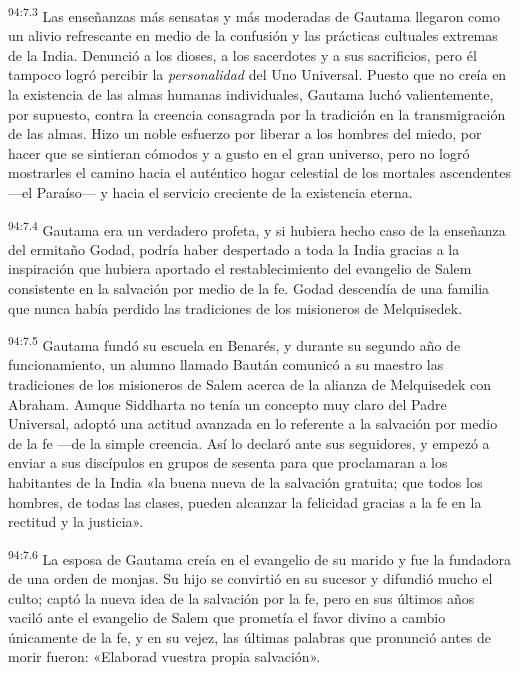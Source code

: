 \par
\textsuperscript{94:7.3} Las enseñanzas más sensatas y más moderadas de Gautama llegaron como un alivio refrescante en medio de la confusión y las prácticas cultuales extremas de la India. Denunció a los dioses, a los sacerdotes y a sus sacrificios, pero él tampoco logró percibir la \textit{personalidad} del Uno Universal. Puesto que no creía en la existencia de las almas humanas individuales, Gautama luchó valientemente, por supuesto, contra la creencia consagrada por la tradición en la transmigración de las almas. Hizo un noble esfuerzo por liberar a los hombres del miedo, por hacer que se sintieran cómodos y a gusto en el gran universo, pero no logró mostrarles el camino hacia el auténtico hogar celestial de los mortales ascendentes ---el Paraíso--- y hacia el servicio creciente de la existencia eterna.

\par
\textsuperscript{94:7.4} Gautama era un verdadero profeta, y si hubiera hecho caso de la enseñanza del ermitaño Godad, podría haber despertado a toda la India gracias a la inspiración que hubiera aportado el restablecimiento del evangelio de Salem consistente en la salvación por medio de la fe. Godad descendía de una familia que nunca había perdido las tradiciones de los misioneros de Melquisedek.

\par
\textsuperscript{94:7.5} Gautama fundó su escuela en Benarés, y durante su segundo año de funcionamiento, un alumno llamado Baután comunicó a su maestro las tradiciones de los misioneros de Salem acerca de la alianza de Melquisedek con Abraham. Aunque Siddharta no tenía un concepto muy claro del Padre Universal, adoptó una actitud avanzada en lo referente a la salvación por medio de la fe ---de la simple creencia. Así lo declaró ante sus seguidores, y empezó a enviar a sus discípulos en grupos de sesenta para que proclamaran a los habitantes de la India «la buena nueva de la salvación gratuita; que todos los hombres, de todas las clases, pueden alcanzar la felicidad gracias a la fe en la rectitud y la justicia».

\par
\textsuperscript{94:7.6} La esposa de Gautama creía en el evangelio de su marido y fue la fundadora de una orden de monjas. Su hijo se convirtió en su sucesor y difundió mucho el culto; captó la nueva idea de la salvación por la fe, pero en sus últimos años vaciló ante el evangelio de Salem que prometía el favor divino a cambio únicamente de la fe, y en su vejez, las últimas palabras que pronunció antes de morir fueron: «Elaborad vuestra propia salvación».


